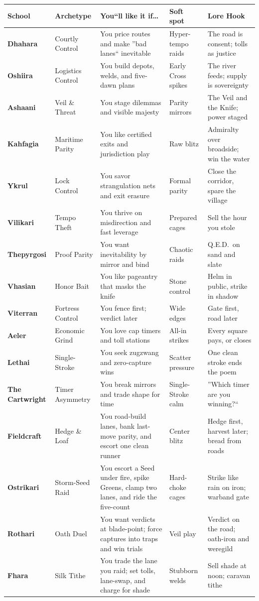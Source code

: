 \documentclass[11pt]{article}
\begin{document}
\begin{tabularx}{\linewidth}{@{}>{\bfseries}p{2.1cm} L L L L@{}}
\toprule
School & Archetype & You``ll like it if\dots & Soft spot & Lore Hook \\
\midrule
Dhahara    & Courtly Control   & You price routes and make ''bad lanes`` inevitable & Hyper-tempo raids & The road is consent; tolls as justice \\
Oshiira    & Logistics Control & You build depots, welds, and five-dawn plans     & Early Cross spikes & The river feeds; supply is sovereignty \\
Ashaani    & Veil \& Threat    & You stage dilemmas and visible majesty           & Parity mirrors     & The Veil and the Knife; power staged \\
Kahfagia   & Maritime Parity   & You like certified exits and jurisdiction play   & Raw blitz          & Admiralty over broadside; win the water \\
Ykrul      & Lock Control      & You savor strangulation nets and exit erasure    & Formal parity      & Close the corridor, spare the village \\
Vilikari   & Tempo Theft       & You thrive on misdirection and fast leverage     & Prepared cages     & Sell the hour you stole \\
Thepyrgosi & Proof Parity      & You want inevitability by mirror and bind        & Chaotic raids      & Q.E.D.\ on sand and slate \\
Vhasian    & Honor Bait        & You like pageantry that masks the knife          & Stone control      & Helm in public, strike in shadow \\
Viterran   & Fortress Control  & You fence first; verdict later                   & Wide edges         & Gate first, road later \\
Aeler      & Economic Grind    & You love cap timers  and toll stations            & All-in strikes     & Every square pays, or closes \\
Lethai     & Single-Stroke     & You seek zugzwang and zero-capture wins          & Scatter pressure   & One clean stroke ends the poem \\
The Cartwright & Timer  Asymmetry   & You break mirrors and trade shape for time       & Single-Stroke calm & ''Which timer are you winning?`` \\
Fieldcraft  & Hedge \& Loaf  & You road-build lanes, bank last-move parity, and escort one clean runner & Center blitz & Hedge first, harvest later; bread from roads \\
Ostrikari  & Storm-Seed Raid & You escort a Seed under fire, spike Greens, clamp two lanes, and ride the five-count & Hard-choke cages & Strike like rain on iron; warband gate \\
Rothari     & Oath Duel      & You want verdicts at blade-point; force captures into traps and win trials & Veil play & Verdict on the road; oath-iron and weregild \\
Fhara       & Silk Tithe     & You trade the lane you raid; set tolls, lane-swap, and charge for shade  & Stubborn welds & Sell shade at noon; caravan tithe \\
\bottomrule
\end{tabularx}
\end{document}
